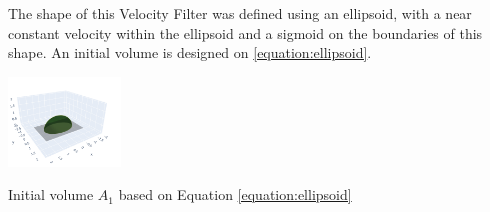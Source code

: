 






The shape of this Velocity Filter was defined using an ellipsoid, with a near constant velocity within the ellipsoid and a sigmoid on the boundaries of this shape. An initial volume is designed on \ref{equation:ellipsoid}.

\begin{marginfigure}%
  \hspace{1cm}\includegraphics[width=3cm]{images/hdi_system/velocity_1_crop2.png}
  \caption{Initial volume $A_{1}$ based on Equation \ref{equation:ellipsoid}}
  \label{fig:vel1}
\end{marginfigure}

